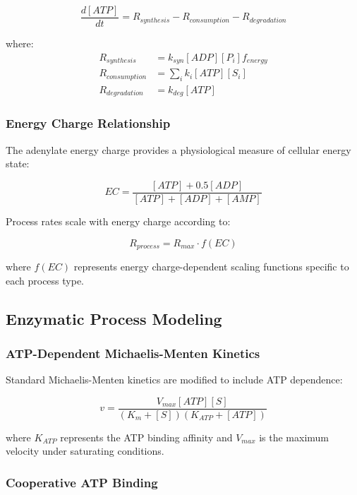 \documentclass[12pt,a4paper]{article}
\begin{document}
\begin{equation}
\frac{d[ATP]}{dt} = R_{synthesis} - R_{consumption} - R_{degradation}
\end{equation}

where:
\begin{align}
R_{synthesis} &= k_{syn}[ADP][P_i]f_{energy} \\
R_{consumption} &= \sum_i k_{i}[ATP][S_i] \\
R_{degradation} &= k_{deg}[ATP]
\end{align}

\subsubsection{Energy Charge Relationship}

The adenylate energy charge provides a physiological measure of cellular energy state:

\begin{equation}
EC = \frac{[ATP] + 0.5[ADP]}{[ATP] + [ADP] + [AMP]}
\end{equation}

Process rates scale with energy charge according to:

\begin{equation}
R_{process} = R_{max} \cdot f(EC)
\end{equation}

where $f(EC)$ represents energy charge-dependent scaling functions specific to each process type.

\subsection{Enzymatic Process Modeling}

\subsubsection{ATP-Dependent Michaelis-Menten Kinetics}

Standard Michaelis-Menten kinetics are modified to include ATP dependence:

\begin{equation}
v = \frac{V_{max}[ATP][S]}{(K_m + [S])(K_{ATP} + [ATP])}
\end{equation}

where $K_{ATP}$ represents the ATP binding affinity and $V_{max}$ is the maximum velocity under saturating conditions.

\subsubsection{Cooperative ATP Binding}
\end{document}
